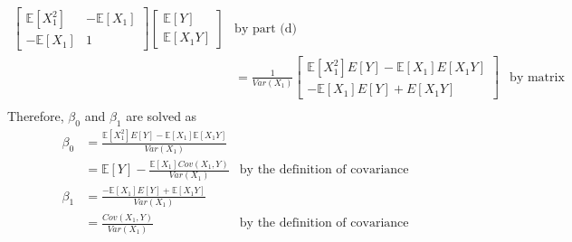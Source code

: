 \documentclass[10pt]{article}
\newcommand{\E}{\mathbb{E}}
\newenvironment{problem}[2][Problem]{\begin{trivlist}
\item[\hskip \labelsep {\bfseries #1}\hskip \labelsep {\bfseries #2.}]}{\end{trivlist}}
\begin{document}
\begin{problem}{1}
\begin{enumerate}[label=(\alph*)]
\begin{align*}
\begin{bmatrix}
                          \E[X_1^2] & -\E[X_1] \\
                          -\E[X_1] & 1
                      \end{bmatrix} \begin{bmatrix}
                        \E[Y] \\
                        \E[X_1Y]
                      \end{bmatrix} & \text{by part (d)} \\
                      &= \frac{1}{Var(X_1)} \begin{bmatrix}
                          \E[X_1^2]E[Y] - \E[X_1]E[X_1Y] \\
                          -\E[X_1]E[Y] + E[X_1Y]
                      \end{bmatrix} & \text{by matrix multiplication} \\
            \end{align*}
            Therefore, $\beta_0$ and $\beta_1$ are solved as
            \begin{align*}
                \beta_0 &= \frac{\E[X_1^2]E[Y] - \E[X_1]\E[X_1Y]}{Var(X_1)} \\
                        &= \E[Y] - \frac{\E[X_1]Cov(X_1, Y)}{Var(X_1)} & \text{by the definition of covariance} \\
                \beta_1 &= \frac{-\E[X_1]E[Y] + \E[X_1Y]}{Var(X_1)} \\
                        &= \frac{Cov(X_1, Y)}{Var(X_1)} & \text{by the definition of covariance}
            \end{align*}
        \end{enumerate}
\end{problem}
\end{document}

